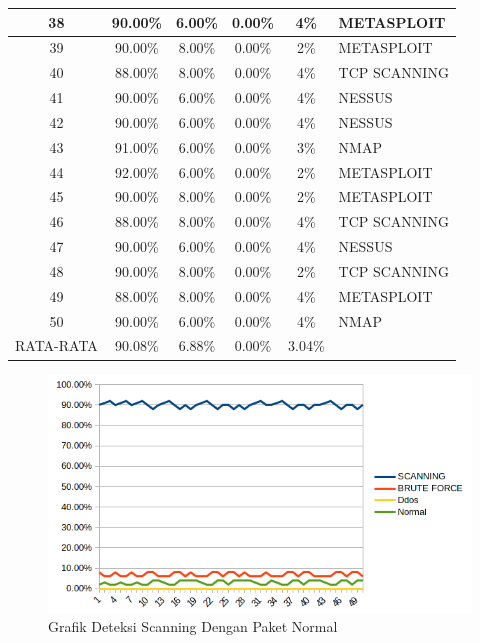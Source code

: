 \begin{table}[H]
\begin{tabular}{|c|c|c|c|c|l|}
			38        & 90.00\%  & 6.00\%      & 0.00\% & 4\%    & METASPLOIT   \\ \hline
			39        & 90.00\%  & 8.00\%      & 0.00\% & 2\%    & METASPLOIT   \\ \hline
			40        & 88.00\%  & 8.00\%      & 0.00\% & 4\%    & TCP SCANNING \\ \hline
			41        & 90.00\%  & 6.00\%      & 0.00\% & 4\%    & NESSUS       \\ \hline
			42        & 90.00\%  & 6.00\%      & 0.00\% & 4\%    & NESSUS       \\ \hline
			43        & 91.00\%  & 6.00\%      & 0.00\% & 3\%    & NMAP         \\ \hline
			44        & 92.00\%  & 6.00\%      & 0.00\% & 2\%    & METASPLOIT   \\ \hline
			45        & 90.00\%  & 8.00\%      & 0.00\% & 2\%    & METASPLOIT   \\ \hline
			46        & 88.00\%  & 8.00\%      & 0.00\% & 4\%    & TCP SCANNING \\ \hline
			47        & 90.00\%  & 6.00\%      & 0.00\% & 4\%    & NESSUS       \\ \hline
			48        & 90.00\%  & 8.00\%      & 0.00\% & 2\%    & TCP SCANNING \\ \hline
			49        & 88.00\%  & 8.00\%      & 0.00\% & 4\%    & METASPLOIT   \\ \hline
			50        & 90.00\%  & 6.00\%      & 0.00\% & 4\%    & NMAP         \\ \hline
			RATA-RATA & 90.08\%  & 6.88\%      & 0.00\% & 3.04\% &              \\ \hline
		\end{tabular}
	\end{table}
	
	
	
	\begin{figure}[H]
		\centering
		\includegraphics[scale=0.9]{gambar/ddosnormal}
		\caption{Grafik Deteksi Scanning  Dengan Paket Normal}
		\label{Grafik Deteksi Scanning  Dengan Paket Normal}
	\end{figure}
	
